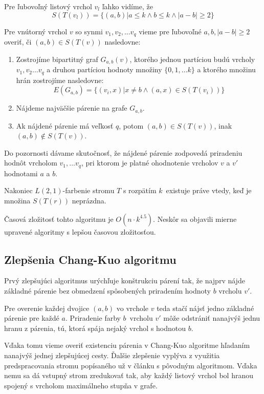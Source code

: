 Pre ľubovoľný listový vrchol $v_l$ ľahko vidíme, že 
$$S(T(v_l)) = \{ (a, b) | a \leq k \wedge b \leq k \wedge |a - b| \ge 2\}$$

Pre vnútorný vrchol $v$ so synmi $v_1, v_2, \ldots v_q$ vieme pre ľubovoľné $a, b, |a - b| \ge 2$ overiť,
či $(a, b) \in S(T(v))$ nasledovne:

\begin{enumerate}
    \item Zostrojíme bipartitný graf $G_{a,b}(v)$, ktorého jednou partíciou budú vrcholy $v_1, v_2 \ldots v_q$ a
    druhou partíciou hodnoty množiny $\{0, 1, \ldots k\}$ a ktorého množinu hrán zostrojíme nasledovne:
    $$E(G_{a,b}) = \{ (v_i, x) | x \neq b \wedge (a, x) \in S(T(v_i))\}$$
    \item Nájdeme najväčšie párenie na grafe $G_{a,b}$.
    \item Ak nájdené párenie má veľkosť $q$, potom $(a,b) \in S(T(v))$, inak $(a,b) \notin S(T(v))$.
\end{enumerate}

Do pozornosti dávame skutočnosť, že nájdené párenie zodpovedá priradeniu hodnôt vrcholom
$v_1, \ldots v_q$, pri ktorom je platné ohodnotenie vrcholov $v$ a $v'$ hodnotami $a$ a $b$.

Nakoniec $L(2,1)$-farbenie stromu $T$ s rozpätím $k$ existuje práve vtedy, keď je množina
$S(T(r))$ neprázdna.

Časová zložitosť tohto algoritmu je $O(n \cdot k^{4.5})$\cite{chang_kuo}. Neskôr sa objavili
mierne upravené algoritmy s lepšou časovou zložitosťou.

\subsection{Zlepšenia Chang-Kuo algoritmu}

Prvý zlepšujúci algoritmus urýchľuje konštrukciu
párení tak, že najprv nájde základné párenie bez obmedzení spôsobených priradením hodnoty $b$
vrcholu $v'$.

Pre overenie každej dvojice $(a,b)$ vo vrchole $v$ teda stačí nájsť jedno základné
párenie pre každé $a$. Priradenie farby $b$ vrcholu $v'$ môže odstrániť nanajvýš jednu hranu z párenia,
tú, ktorá spája nejaký vrchol s hodnotou $b$. 

Vďaka tomu vieme overiť existenciu párenia v Chang-Kuo algoritme hľadaním nanajvýš
jednej zlepšujúcej cesty. Ďalšie zlepšenie vyplýva z využitia predspracovania stromu popísaného
už v článku s pôvodným algoritmom. Vďaka nemu sa dá vstupný strom zredukovať tak, aby každý
listový vrchol bol hranou spojený s vrcholom maximálneho stupňa v grafe\cite{chang_kuo}.


